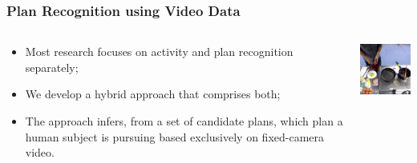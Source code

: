 \documentclass[usenames,dvipsnames]{beamer}
\begin{document}
\begin{frame}[c]\frametitle{Plan Recognition using Video Data}
	\begin{columns}
		\begin{column}{.7\textwidth}
			\begin{itemize}
				\item Most research focuses on activity and plan recognition separately;
				\item We develop a hybrid approach that comprises both;
				\item The approach infers, from a set of candidate plans, which plan a human subject is pursuing based exclusively on fixed-camera video.
			\end{itemize}
		\end{column}
		\begin{column}{.3\textwidth}
			\begin{center}
				\includegraphics[width=9em]{fig/computer-vision-eggs.pdf}
			\end{center}
		\end{column}
	\end{columns}
\end{frame}
\end{document}
